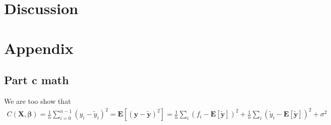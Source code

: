 \documentclass[a4paper,10pt,english]{article}
\begin{document}


\section{Discussion}
\label{sec:discussion}

\newpage

\section{Appendix}
\label{sec:appendix}
	
\subsection{Part c math}

We are too show that 
\begin{align}
C(\boldsymbol{X}, \boldsymbol{\beta})=\frac{1}{n} \sum_{i=0}^{n-1}\left(y_{i}-\tilde{y}_{i}\right)^{2}
= \mathbf{E}\left[(\boldsymbol{y}-\tilde{\boldsymbol{y}})^{2}\right]
=\frac{1}{n} \sum_{i}\left(f_{i}-\mathbf{E}[\tilde{\boldsymbol{y}}]\right)^{2}+\frac{1}{n} \sum_{i}\left(\tilde{y}_{i}-\mathbf{E}[\tilde{\boldsymbol{y}}]\right)^{2}+\sigma^{2}
\end{align}
\end{document}
